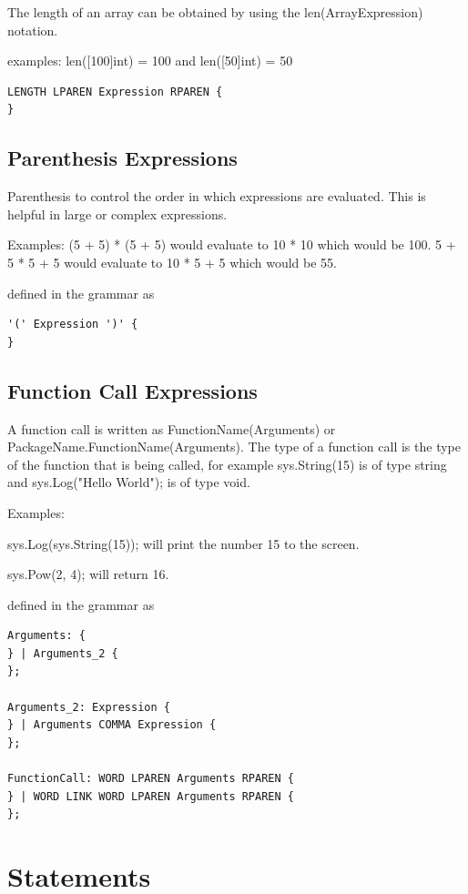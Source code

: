 \documentclass[]{final_report}
\begin{document}
The length of an array can be obtained by using the len(ArrayExpression) notation.

examples:
len([100]int) = 100 and len([50]int) = 50

\begin{verbatim}LENGTH LPAREN Expression RPAREN {
}
\end{verbatim}

\subsection{Parenthesis Expressions}

Parenthesis to control the order in which expressions are evaluated. This is helpful in large or complex expressions.

Examples: (5 + 5) * (5 + 5) would evaluate to 10 * 10 which would be 100. 5 + 5 * 5 + 5 would evaluate to 10 * 5 + 5 which would be 55.

defined in the grammar as
\begin{verbatim}
'(' Expression ')' {
}
\end{verbatim}

\subsection{Function Call Expressions}

A function call is written as FunctionName(Arguments) or PackageName.FunctionName(Arguments). The type of a function call is the type of the function that is being called, for example sys.String(15) is of type string and sys.Log("Hello World"); is of type void.

Examples:

sys.Log(sys.String(15)); will print the number 15 to the screen.

sys.Pow(2, 4); will return 16.

defined in the grammar as
\begin{verbatim}
Arguments: {
} | Arguments_2 {
};

Arguments_2: Expression {
} | Arguments COMMA Expression {
};

FunctionCall: WORD LPAREN Arguments RPAREN {
} | WORD LINK WORD LPAREN Arguments RPAREN {
};
\end{verbatim}

\section{Statements}
\end{document}

